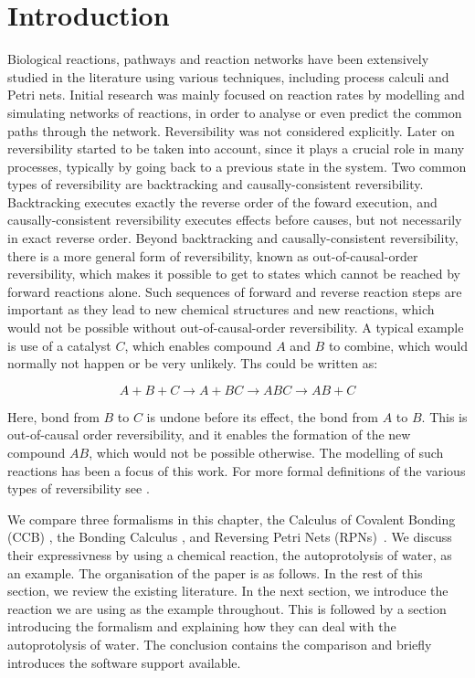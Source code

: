 \documentclass[runningheads]{llncs}
\begin{document}
\section{Introduction}

Biological reactions, pathways and reaction networks have been extensively studied in the literature using
various  techniques,  including  process  calculi and Petri nets.  Initial research was mainly focused  on
reaction rates by modelling and simulating networks of reactions, in order to
analyse or even predict the common paths through the network.  Reversibility
was not considered explicitly.  Later on
reversibility  started  to  be  taken  into  account,  since  it  plays  a  crucial  role  in
many processes, typically by going back to a previous state in the system. Two common types of reversibility 
are backtracking and causally-consistent reversibility. Backtracking executes exactly the reverse order of the 
foward execution, and causally-consistent reversibility executes effects before causes, but not necessarily in exact reverse 
order. Beyond backtracking and causally-consistent reversibility, there is a more general form of reversibility, known as out-of-causal-order reversibility, which makes it possible to get to states which cannot be reached by forward reactions alone.  Such sequences
of forward and reverse reaction steps are important as they lead to new chemical
structures and new reactions, which would not be possible without out-of-causal-order
reversibility. A typical example is use of a catalyst $C$, which enables compound $A$ and $B$ to combine, which would normally not happen 
or be very unlikely. Ths could be written as:

$$ A + B + C \rightarrow A+ BC \rightarrow ABC \rightarrow AB + C$$

Here, bond from $B$ to $C$ is undone before its effect, the bond from $A$ to $B$. This is out-of-causal order reversibility, and it enables 
the formation of the new compound $AB$, which would not be possible otherwise. The modelling of such reactions has been a focus of this work. For more formal definitions of the various types of reversibility see \cite{Irek2012}.

We compare three formalisms in this chapter, the Calculus of Covalent Bonding (CCB) \cite{KUHN201818}, the Bonding Calculus \cite{NaCo18}, and Reversing Petri Nets (RPNs)~\cite{RPNs}. We discuss their expressivness by using a chemical reaction, the autoprotolysis of water, as an example. The organisation of the paper is as follows. In the rest of this section, we review the existing literature. In the next section, we introduce the reaction we are using as the example throughout. This is followed by a section introducing the formalism and explaining how they can deal with the autoprotolysis of water. The conclusion contains the comparison and briefly introduces the software support available.
\end{document}
